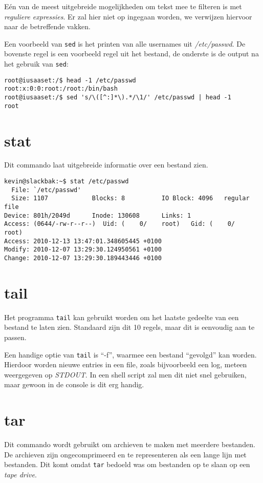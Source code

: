 E\'{e}n van de meest uitgebreide mogelijkheden om tekst mee te filteren is met \emph{reguliere expressies}\cite{bib.regex}\cite{bib.regex.bropj}. Er zal hier niet op ingegaan worden, we verwijzen hiervoor naar de betreffende vakken.

Een voorbeeld van \texttt{sed} is het printen van alle usernames uit \emph{/etc/passwd}. De bovenste regel is een voorbeeld regel uit het bestand, de onderste is de output na het gebruik van \texttt{sed}:
\begin{lstlisting}
root@iusaaset:/$ head -1 /etc/passwd
root:x:0:0:root:/root:/bin/bash
root@iusaaset:/$ sed 's/\([^:]*\).*/\1/' /etc/passwd | head -1
root
\end{lstlisting}

\section{stat}
Dit commando laat uitgebreide informatie over een bestand zien. 
\begin{lstlisting}
kevin@slackbak:~$ stat /etc/passwd
  File: `/etc/passwd'
  Size: 1107            Blocks: 8          IO Block: 4096   regular file
Device: 801h/2049d      Inode: 130608      Links: 1
Access: (0644/-rw-r--r--)  Uid: (    0/    root)   Gid: (    0/    root)
Access: 2010-12-13 13:47:01.348605445 +0100
Modify: 2010-12-07 13:29:30.124950561 +0100
Change: 2010-12-07 13:29:30.189443446 +0100
\end{lstlisting}%

\section{tail}
Het programma \texttt{tail} kan gebruikt worden om het laatste gedeelte van een bestand te laten zien. Standaard zijn dit 10 regels, maar dit is eenvoudig aan te passen. 

Een handige optie van \texttt{tail} is ``-f'', waarmee een bestand ``gevolgd'' kan worden. Hierdoor worden nieuwe entries in een file, zoals bijvoorbeeld een log, meteen weergegeven op \emph{STDOUT}. In een shell script zal men dit niet snel gebruiken, maar gewoon in de console is dit erg handig.

\section{tar}
Dit commando wordt gebruikt om archieven te maken met meerdere bestanden. De archieven zijn ongecomprimeerd en te representeren als een lange lijn met bestanden. Dit komt omdat \texttt{tar} bedoeld was om bestanden op te slaan op een \emph{tape drive}. 

